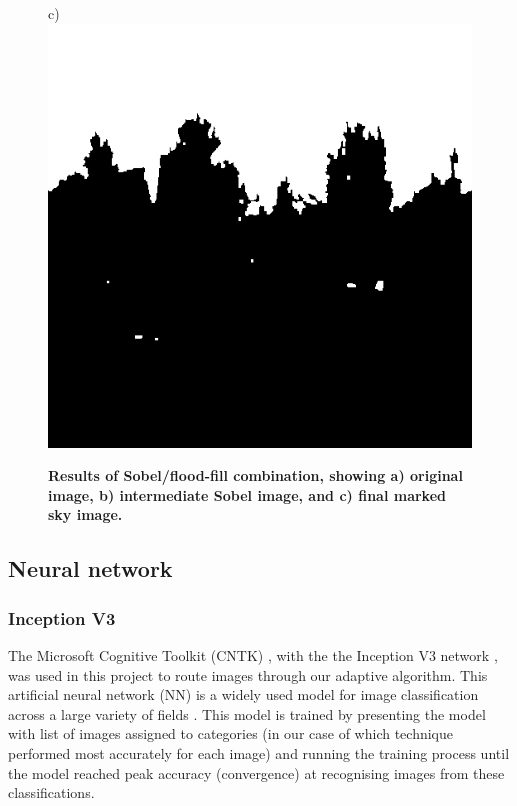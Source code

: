 \documentclass[final,3p,times,authoryear]{elsarticle}
\begin{document}
\begin{figure}
c)\includegraphics[scale=0.25]{Images/FloodfillOutput.png}
\caption{\bf   Results of Sobel/flood-fill combination, showing a) original image, b) intermediate Sobel image, and c) final marked sky image.}    
 \label{fig:sobelflood}  
\end{figure} 

\subsection{Neural network}\label{sec:nn}

\subsubsection{Inception V3}\label{sec:inception}
The Microsoft Cognitive Toolkit (CNTK) \citep{Yu2015,Agarwal2016}, with the the Inception V3 network \citep{Szegedy2015a}, was used in this project to route images through our adaptive algorithm. This artificial neural network (NN) is a widely used model for image classification across a large variety of fields \citep{Xia2017,Hassannejad2016}. This model is trained by presenting the model with list of images assigned to categories (in our case of which technique performed most accurately for each image) and running the training process until the model reached peak accuracy (convergence) at recognising images from these classifications.
\end{document}

